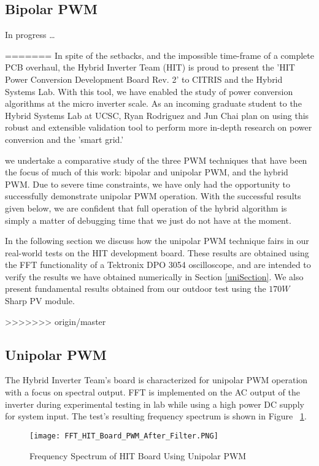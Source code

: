 \subsection{Bipolar PWM}
In progress \ldots

=======
In spite of the setbacks, and the impossible time-frame of a complete PCB overhaul, the Hybrid Inverter Team (HIT) is proud to present the 'HIT Power Conversion Development Board Rev. 2' to CITRIS and the Hybrid Systems Lab. With this tool, we have enabled the study of power conversion algorithms at the micro inverter scale. As an incoming graduate student to the Hybrid Systems Lab at UCSC, Ryan Rodriguez and Jun Chai plan on using this robust and extensible validation tool to perform more in-depth research on power conversion and the 'smart grid.' 


we undertake a comparative study of the three PWM techniques that have been the focus of much of this work: bipolar and unipolar PWM, and the hybrid PWM. 
Due to severe time constraints, we have only had the opportunity to successfully demonstrate unipolar PWM operation. With the successful results given below, we are confident that full operation of the hybrid algorithm is simply a matter of debugging time that we just do not have at the moment.

In the following section we discuss how the unipolar PWM technique fairs in our real-world tests on the HIT development board. These results are obtained using the FFT functionality of a Tektronix DPO 3054 oscilloscope, and are intended to verify the results we have obtained numerically in Section \ref{uniSection}. We also present fundamental results obtained from our outdoor test using the $170W$ Sharp PV module.

>>>>>>> origin/master
\subsection{Unipolar PWM}
The Hybrid Inverter Team's board is characterized for unipolar PWM operation with a focus on spectral output. FFT is implemented on the AC output of the inverter during experimental testing in lab while using a high power DC supply for system input. The test's resulting frequency spectrum is shown in Figure ~\ref{FFT HIT Board PWM After Filter}.

\begin{figure}
\centering
\texttt{[image: FFT\_HIT\_Board\_PWM\_After\_Filter.PNG]}
\caption{Frequency Spectrum of HIT Board Using Unipolar PWM}
\label{FFT HIT Board PWM After Filter}
\end{figure}

